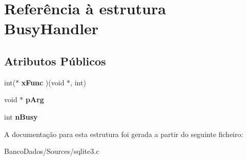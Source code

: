 \hypertarget{struct_busy_handler}{\section{Referência à estrutura Busy\-Handler}
\label{struct_busy_handler}
}
\subsection*{Atributos Públicos}
\begin{DoxyCompactItemize}
\item 
\hypertarget{struct_busy_handler_aafc84c4e4934de2d5bdf02f268e9340f}{int($\ast$ {\bfseries x\-Func} )(void $\ast$, int)}\label{struct_busy_handler_aafc84c4e4934de2d5bdf02f268e9340f}

\item 
\hypertarget{struct_busy_handler_a1c793d2b815e79cf3684de46847551bd}{void $\ast$ {\bfseries p\-Arg}}\label{struct_busy_handler_a1c793d2b815e79cf3684de46847551bd}

\item 
\hypertarget{struct_busy_handler_aac4531c677ed5ae9e4757ca1b02c568b}{int {\bfseries n\-Busy}}\label{struct_busy_handler_aac4531c677ed5ae9e4757ca1b02c568b}

\end{DoxyCompactItemize}


A documentação para esta estrutura foi gerada a partir do seguinte ficheiro\-:\begin{DoxyCompactItemize}
\item 
Banco\-Dados/\-Sources/sqlite3.\-c\end{DoxyCompactItemize}

